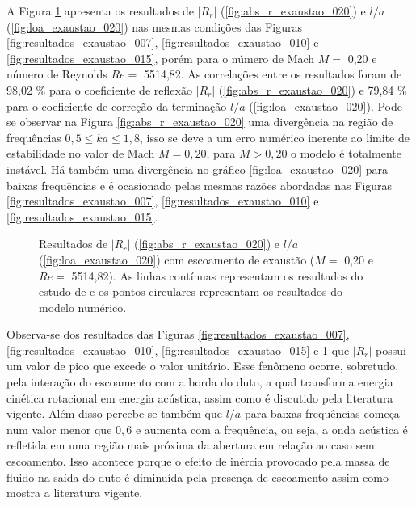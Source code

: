 A Figura \ref{fig:resultados_exaustao_020} apresenta os resultados de $|R_{r}|$ (\ref{fig:abs_r_exaustao_020}) e  $l/a$ (\ref{fig:loa_exaustao_020}) nas mesmas condições das Figuras \ref{fig:resultados_exaustao_007}, \ref{fig:resultados_exaustao_010} e \ref{fig:resultados_exaustao_015}, porém para o número de Mach $M =$ 0,20 e número de Reynolds $Re =$ 5514,82. As correlações entre os resultados foram de 98,02 \% para o coeficiente de reflexão $|R_{r}|$ (\ref{fig:abs_r_exaustao_020}) e 79,84 \% para o coeficiente de correção da terminação $l/a$ (\ref{fig:loa_exaustao_020}). Pode-se observar na Figura \ref{fig:abs_r_exaustao_020} uma divergência na região de frequências $0,5 \leq ka \leq 1,8$, isso se deve a um erro numérico inerente ao limite de estabilidade no valor de Mach $M = 0,20$, para $M > 0,20$ o modelo é totalmente instável. Há também uma divergência no gráfico \ref{fig:loa_exaustao_020} para baixas frequências e é ocasionado pelas mesmas razões abordadas nas Figuras \ref{fig:resultados_exaustao_007}, \ref{fig:resultados_exaustao_010} e \ref{fig:resultados_exaustao_015}.


\begin{figure}[ht!]
\begin{subfigure}{\scaleA \textwidth}
  
\end{subfigure}%
\begin{subfigure}{\scaleA \textwidth}
  
\end{subfigure}
\caption[Resultados de $|R_{r}|$ e $l/a$ com escoamento de exaustão (M $=$ 0,2 e Re $=$ 5514,82)]{Resultados de $|R_{r}|$ (\ref{fig:abs_r_exaustao_020}) e $l/a$ (\ref{fig:loa_exaustao_020}) com escoamento de exaustão ($M =$ 0,20 e $Re =$ 5514,82). As linhas contínuas representam os resultados do estudo de  e os pontos circulares representam os resultados do modelo numérico.}
\label{fig:resultados_exaustao_020}
\end{figure}

\newpage
Observa-se dos resultados das Figuras \ref{fig:resultados_exaustao_007}, \ref{fig:resultados_exaustao_010}, \ref{fig:resultados_exaustao_015} e \ref{fig:resultados_exaustao_020} que $|R_{r}|$ possui um valor de pico que excede o valor unitário. Esse fenômeno ocorre, sobretudo, pela interação do escoamento com a borda do duto, a qual transforma energia cinética rotacional em energia acústica, assim como é discutido pela literatura vigente. Além disso percebe-se também que $l/a$ para baixas frequências começa num valor menor que $0,6$ e aumenta com a frequência, ou seja, a onda acústica é refletida em uma região mais próxima da abertura em relação ao caso sem escoamento. Isso acontece porque o efeito de inércia provocado pela massa de fluido na saída do duto é diminuída pela presença de escoamento assim como mostra a literatura vigente.


